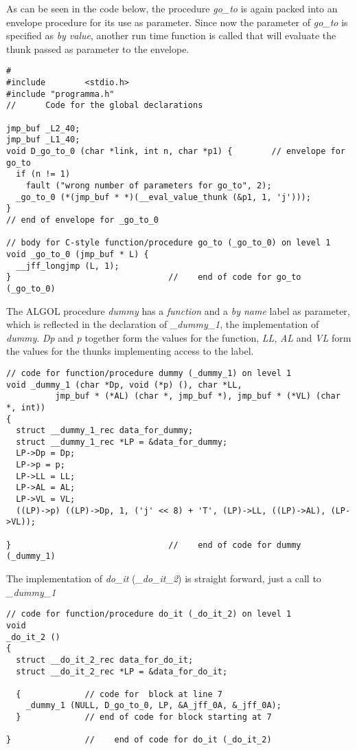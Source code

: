 \documentclass[11pt]{article}
\begin{document}
As can be seen in the code below, the procedure {\em go\_to} is again
packed into an envelope procedure for its use as parameter. Since now
the parameter of {\em go\_to} is specified as {\em by value}, another
run time function is called that will evaluate the thunk passed as parameter
to the envelope.
{\footnotesize
\begin{verbatim}
#
#include        <stdio.h>
#include "programma.h"
//      Code for the global declarations

jmp_buf _L2_40;
jmp_buf _L1_40;
void D_go_to_0 (char *link, int n, char *p1) {        // envelope for go_to
  if (n != 1)
    fault ("wrong number of parameters for go_to", 2);
  _go_to_0 (*(jmp_buf * *)(__eval_value_thunk (&p1, 1, 'j')));
}
// end of envelope for _go_to_0 

// body for C-style function/procedure go_to (_go_to_0) on level 1
void _go_to_0 (jmp_buf * L) {
  __jff_longjmp (L, 1);
}                                //    end of code for go_to (_go_to_0)
\end{verbatim}
}
The ALGOL procedure {\em dummy} has a
{\em function} and a {\em by name} label as parameter, which is
reflected in the declaration of {\em \_dummy\_1}, the implementation
of {\em dummy}. {\em Dp} and {\em p} together form the values for the function,
{\em LL}, {\em AL} and {\em VL} form the values for the thunks implementing
access to the label.
{\footnotesize
\begin{verbatim}
// code for function/procedure dummy (_dummy_1) on level 1
void _dummy_1 (char *Dp, void (*p) (), char *LL,
          jmp_buf * (*AL) (char *, jmp_buf *), jmp_buf * (*VL) (char *, int))
{
  struct __dummy_1_rec data_for_dummy;
  struct __dummy_1_rec *LP = &data_for_dummy;
  LP->Dp = Dp;
  LP->p = p;
  LP->LL = LL;
  LP->AL = AL;
  LP->VL = VL;
  ((LP)->p) ((LP)->Dp, 1, ('j' << 8) + 'T', (LP)->LL, ((LP)->AL), (LP->VL));

}                                //    end of code for dummy (_dummy_1)
\end{verbatim}
}
The implementation of {\em do\_it} ({\em \_do\_it\_2}) is
straight forward, just a call to {\em \_dummy\_1} 
{\footnotesize
\begin{verbatim}
// code for function/procedure do_it (_do_it_2) on level 1
void
_do_it_2 ()
{
  struct __do_it_2_rec data_for_do_it;
  struct __do_it_2_rec *LP = &data_for_do_it;

  {				// code for  block at line 7 
    _dummy_1 (NULL, D_go_to_0, LP, &A_jff_0A, &_jff_0A);
  }				// end of code for block starting at 7

}				//    end of code for do_it (_do_it_2)
\end{verbatim}
}
\end{document}
